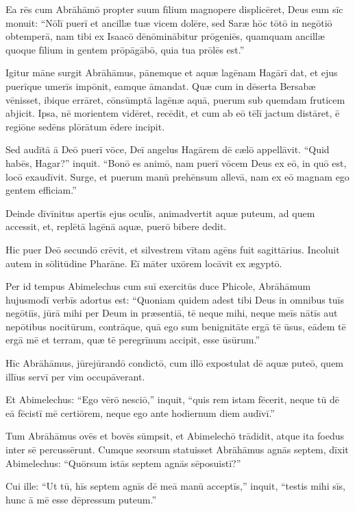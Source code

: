 \Versus Ea rēs cum Abrāhāmō propter suum fīlium magnopere displicēret,
\Versus Deus eum sīc monuit: ``Nōlī puerī et ancillæ tuæ vicem dolēre, sed Saræ hōc tōtō in negōtiō obtemperā, nam tibi ex Isaacō dēnōminābitur prōgeniēs,
\Versus quamquam ancillæ quoque fīlium in gentem prōpāgābō, quia tua prōlēs est.''

\Versus Igitur māne surgit Abrāhāmus, pānemque et aquæ lagēnam Hagārī dat, et ejus puerīque umerīs impōnit, eamque āmandat. Quæ cum in dēserta Bersabæ vēnisset, ibique errāret,
\Versus cōnsūmptā lagēnæ aquā, puerum sub quemdam fruticem abjicit.
\Versus Ipsa, nē morientem vidēret, recēdit, et cum ab eō tēlī jactum distāret, ē regiōne sedēns plōrātum ēdere incipit.

\Versus Sed audītā ā Deō puerī vōce, Deī angelus Hagārem dē cælō appellāvit. ``Quid habēs, Hagar?'' inquit. ``Bonō es animō, nam puerī vōcem Deus ex eō, in quō est, locō exaudīvit.
\Versus Surge, et puerum manū prehēnsum allevā, nam ex eō magnam ego gentem efficiam.''

\Versus Deinde dīvīnitus apertīs ejus oculīs, animadvertit aquæ puteum, ad quem accessit, et, replētā lagēnā aquæ, puerō bibere dedit.

\Versus Hic puer Deō secundō crēvit, et silvestrem vītam agēns fuit sagittārius.
\Versus Incoluit autem in sōlitūdine Pharāne. Eī māter uxōrem locāvit ex ægyptō.

\Versus Per id tempus Abimelechus cum suī exercitūs duce Phicole, Abrāhāmum hujusmodī verbīs adortus est: ``Quoniam quidem adest tibi Deus in omnibus tuīs negōtiīs,
\Versus jūrā mihi per Deum in præsentiā, tē neque mihi, neque meīs nātīs aut nepōtibus nocitūrum, contrāque, quā ego sum benignitāte ergā tē ūsus, eādem tē ergā mē et terram, quæ tē peregrīnum accipit, esse ūsūrum.''

\Versus Hīc Abrāhāmus, jūrejūrandō condictō,
\Versus cum illō expostulat dē aquæ puteō, quem illīus servī per vim occupāverant.

\Versus Et Abimelechus: ``Ego vērō nesciō,'' inquit, ``quis rem istam fēcerit, neque tū dē eā fēcistī mē certiōrem, neque ego ante hodiernum diem audīvī.''

\Versus Tum Abrāhāmus ovēs et bovēs sūmpsit, et Abimelechō trādidit, atque ita foedus inter sē percussērunt.
\Versus Cumque seorsum statuisset Abrāhāmus agnās septem,
\Versus dīxit Abimelechus: ``Quōrsum istās septem agnās sēposuistī?''

\Versus Cui ille: ``Ut tū, hīs septem agnīs dē meā manū acceptīs,'' inquit, ``testis mihi sīs, hunc ā mē esse dēpressum puteum.''

